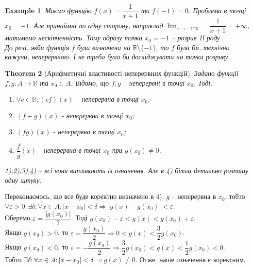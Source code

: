 \documentclass[a4paper, 14pt]{article}
\theoremstyle{theoremdd}
\newtheorem{theorem}{Theorem}[subsection]
\theoremstyle{theoremdd}
\theoremstyle{theoremdd}
\theoremstyle{theoremdd}
\newtheorem{example}[theorem]{Example}
\theoremstyle{theoremdd}
\theoremstyle{theoremdd}
\theoremstyle{theoremdd}
\theoremstyle{theoremdd}
\begin{document}
\begin{example} Маємо функцію $f(x) = \dfrac{1}{x+1}$ та $f(-1) = 0$. Проблема в точці $x_0 = -1$. Але принаймні по одну сторону, наприклад $\displaystyle \lim_{x \to -1^+0} =\dfrac{1}{x+1} = +\infty$, матимемо нескінченність. Тому одразу точка $x_0 = -1$ -- розрив II роду.\\
До речі, якби функція $f$ була визначена на $\mathbb{R} \setminus \{-1\}$, то $f$ була би, технічно кажучи, неперервною. І не треба було би досліджувати на точки розриву.
\\ \iffalse %
\begin{figure}[H]
\centering
{
\begin{tikzpicture}

\draw[thick, ->] (-3,0)--(1,0) node[anchor = north] {$x$};
\draw[thick, ->] (0,-3)--(0,3) node[anchor = east] {$y$};

\draw[thick, domain=-3:-1.35, variable=\x, samples = 1000] plot({\x}, {1/(\x+1)});
\draw[thick, domain=-0.65:1, variable=\x, samples = 1000] plot({\x}, {1/(\x+1)});
\draw[dashed] (-1,-3)--(-1,3);
\draw (-1,1pt)--(-1,-1pt) node[anchor = north] {$-1$};
\end{tikzpicture}
}
\end{figure}
\fi %
\end{example}

\begin{theorem}[Арифметичні властивості неперервних функцій]
Задано функції $f,g \colon A \to \mathbb{R}$ та $x_0 \in A$. Відомо, що $f,g$ -- неперервні в точці $x_0$. Тоді:
\begin{enumerate}[nosep,wide=0pt,label={\arabic*)}]
\item $\forall c \in \mathbb{R}: (cf)(x)$ -- неперервна в точці $x_0$;
\item $(f+g)(x)$ - неперервна в точці $x_0$;
\item $(fg)(x)$ - неперервна в точці $x_0$;
\item $\dfrac{f}{g}(x)$ - неперервна в точці $x_0$ при $g(x_0) \neq 0$.
\end{enumerate}
\textit{1),2),3),4) -- всі вони випливають із означення. Але в 4) більш детально розпишу одну штуку.}
\end{theorem}
Переконаємось, що все буде коректно визначено в 4).
$g$ -- неперервна в $x_0$, тобто $\forall \varepsilon > 0: \exists \delta: \forall x \in A: |x-x_0|<\delta \Rightarrow |g(x)-g(x_0)|<\varepsilon$.\\
Оберемо $\varepsilon = \dfrac{|g(x_0)|}{2}$. Тоді $g(x_0)-\varepsilon <g(x) <g(x_0)+\varepsilon$.\\
Якщо $g(x_0) > 0$, то $\varepsilon = \dfrac{g(x_0)}{2} \Rightarrow 0 < g(x) < \dfrac{3}{2}g(x_0)$.\\
Якщо $g(x_0) < 0$, то $\varepsilon = -\dfrac{g(x_0)}{2} \Rightarrow \dfrac{3}{2}g(x_0) < g(x) < \dfrac{1}{2}g(x_0) < 0$.\\
Тобто $\exists \delta: \forall x \in A: |x-x_0|<\delta \Rightarrow g(x) \neq 0$. Отже, наше означення є коректним.
\end{document}
